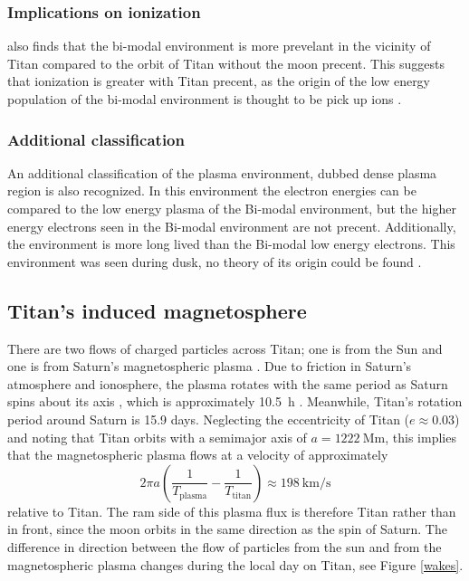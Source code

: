 \documentclass[12pt, parskip=full*, abstract]{scrartcl}
\begin{document}
\subsubsection{Implications on ionization}
\textcite{Smith-WithOrWithoutTitan} also finds that the bi-modal environment is more prevelant in the vicinity of Titan compared to the orbit of Titan without the moon precent. This suggests that ionization is greater with Titan precent, as the origin of the low energy population of the bi-modal environment is thought to be pick up ions \parencite{Smith-WithOrWithoutTitan}. 

\subsubsection{Additional classification}%
An additional classification of the plasma environment, dubbed dense plasma region is also recognized. In this environment the electron energies can be compared to the low energy plasma of the Bi-modal environment, but the higher energy electrons seen in the Bi-modal environment are not precent. Additionally, the environment is more long lived than the Bi-modal low energy electrons. This environment was seen during dusk, no theory of its origin could be found \parencite{Smith-WithOrWithoutTitan}.

\subsection{Titan's induced magnetosphere}

There are two flows of charged particles across Titan; one is from the Sun and one is from Saturn's magnetospheric plasma \parencite{ionosphere-magnetosphere-interaction-coates}. Due to friction in Saturn's atmosphere and ionosphere, the plasma rotates with the same period as Saturn spins about its axis \parencite{solar-system-magnetospheres}, which is approximately \SI{10.5}{\hour} \parencite{fundamental-planetary-science}. Meanwhile, Titan's rotation period around Saturn is 15.9 days. Neglecting the eccentricity of Titan ($e\approx0.03$) and noting that Titan orbits with a semimajor axis of $a=\SI{1222}{\mega\metre}$, this implies that the magnetospheric plasma flows at a velocity of approximately
\begin{equation}
	2\pi a\left(\frac{1}{T_\text{plasma}} - \frac{1}{T_\text{titan}}\right)\approx\SI{198}{\kilo\metre\per\second}
\end{equation}
relative to Titan. The ram side of this plasma flux is therefore  Titan rather than in front, since the moon orbits in the same direction as the spin of Saturn. The difference in direction between the flow of particles from the sun and from the magnetospheric plasma changes during the local day on Titan, see Figure \ref{wakes}. 
\end{document}
